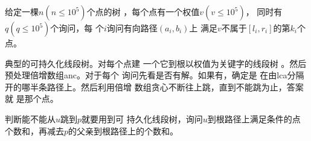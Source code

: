 \begin{prob}
	给定一棵$n(n\le 10^5)$个点的树
	，每个点有一个权值$v(v\le 10^5)$，
	同时有$q(q \le 10^5)$个询问，每
	个$i$询问有向路径$(a_i,b_i)$上
	满足$v$不属于$[l_i,r_i]$的第$k_i$个点。
\end{prob}

\begin{sol}
	典型的可持久化线段树。对每个点建
	一个它到根以权值为关键字的线段树
	。然后预处理倍增数组anc。对于每个
	询问先看是否有解。如果有，确定是
	在由lca分隔开的哪半条路径上。然后利用倍增
	数组贪心不断往上跳，直到不能跳为止，答案就
	是那个点。
	\par 判断能不能从$u$跳到$p$就要用到可
	持久化线段树，询问$u$到根路径上满足条件的点
	个数和，再减去$p$的父亲到根路径上的个数和。
\end{sol}
